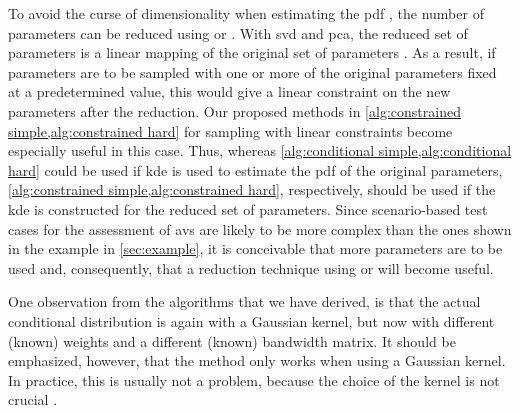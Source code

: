 To avoid the curse of dimensionality when estimating the \ac{pdf} \autocite{scott1992multivariate}, the number of parameters can be reduced using  or .
With \ac{svd} and \ac{pca}, the reduced set of parameters is a linear mapping of the original set of parameters \autocite{golub2013matrix, abdi2010principal}.
As a result, if parameters are to be sampled with one or more of the original parameters fixed at a predetermined value, this would give a linear constraint on the new parameters after the reduction.
Our proposed methods in \cref{alg:constrained simple,alg:constrained hard} for sampling with linear constraints become especially useful in this case.
Thus, whereas \cref{alg:conditional simple,alg:conditional hard} could be used if \ac{kde} is used to estimate the \ac{pdf} of the original parameters, \cref{alg:constrained simple,alg:constrained hard}, respectively, should be used if the \ac{kde} is constructed for the reduced set of parameters.
Since scenario-based test cases for the assessment of \acp{av} are likely to be more complex than the ones shown in the example in \cref{sec:example}, it is conceivable that more parameters are to be used and, consequently, that a reduction technique using  or  will become useful.

\cstarta One observation from the algorithms that we have derived, is that the actual conditional distribution is again  with a Gaussian kernel, but now with different (known) weights and a different (known) bandwidth matrix. 
It should be emphasized, however, that the method only works when using a Gaussian kernel. 
In practice, this is usually not a problem, because the choice of the kernel is not crucial \autocite{duong2007ks}. \cenda
